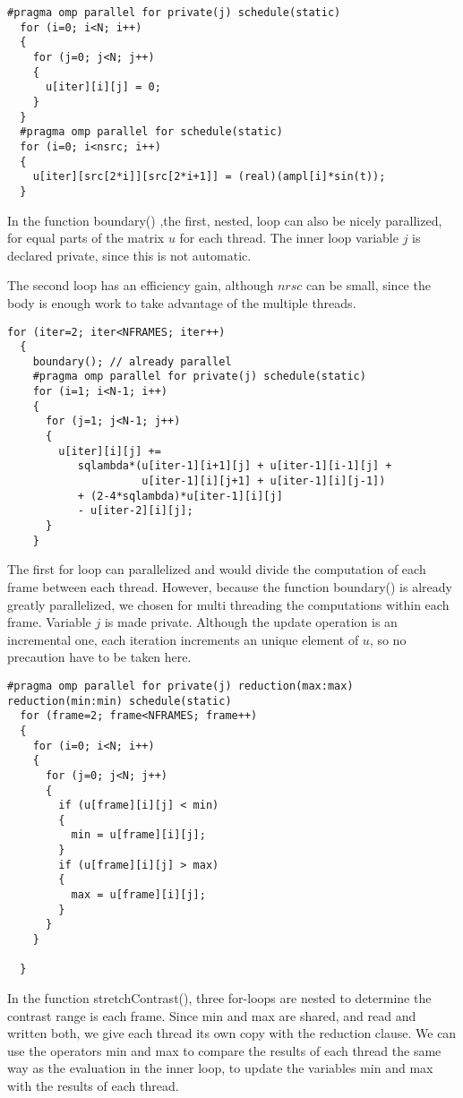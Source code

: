 \documentclass[a4paper]{article}
\begin{document}
\begin{enumerate}[(a)]
\begin{verbatim}
#pragma omp parallel for private(j) schedule(static)
  for (i=0; i<N; i++)
  {
    for (j=0; j<N; j++)
    {
      u[iter][i][j] = 0;
    }
  }
  #pragma omp parallel for schedule(static)
  for (i=0; i<nsrc; i++)
  {
    u[iter][src[2*i]][src[2*i+1]] = (real)(ampl[i]*sin(t));
  }
\end{verbatim}
In the function boundary() ,the first, nested, loop can also be nicely parallized, for equal parts of the matrix $u$ for each thread. The inner loop variable $j$ is declared private, since this is not automatic.

The second loop has an efficiency gain, although $nrsc$ can be small, since the body is enough work to take advantage of the multiple threads.
\begin{verbatim}
for (iter=2; iter<NFRAMES; iter++)
  {
	boundary(); // already parallel
	#pragma omp parallel for private(j) schedule(static)
	for (i=1; i<N-1; i++)
	{
	  for (j=1; j<N-1; j++)
	  {
		u[iter][i][j] += 
		   sqlambda*(u[iter-1][i+1][j] + u[iter-1][i-1][j] + 
					 u[iter-1][i][j+1] + u[iter-1][i][j-1])
		   + (2-4*sqlambda)*u[iter-1][i][j]
		   - u[iter-2][i][j];
	  }
	}
\end{verbatim}
The first for loop can parallelized and would divide the computation of each frame between each thread. However, because the function boundary() is already greatly parallelized, we chosen for multi threading the computations within each frame. Variable $j$ is made private. Although the update operation is an incremental one, each iteration increments an unique element of $u$, so no precaution have to be taken here.

\begin{verbatim}
#pragma omp parallel for private(j) reduction(max:max) reduction(min:min) schedule(static) 
  for (frame=2; frame<NFRAMES; frame++)
  {
    for (i=0; i<N; i++)
    {
      for (j=0; j<N; j++)
      {
        if (u[frame][i][j] < min)
        {
          min = u[frame][i][j];
        }
        if (u[frame][i][j] > max)
        {
          max = u[frame][i][j];
        }
      }
    }
 	
  }
\end{verbatim}
In the function stretchContrast(), three for-loops are nested to determine the contrast range is each frame. Since min and max are shared, and read and written both, we give each thread its own copy with the reduction clause. We can use the operators min and max to compare the results of each thread the same way as the evaluation in the inner loop, to update the variables min and max with the results of each thread.


\end{enumerate}
\end{document}
